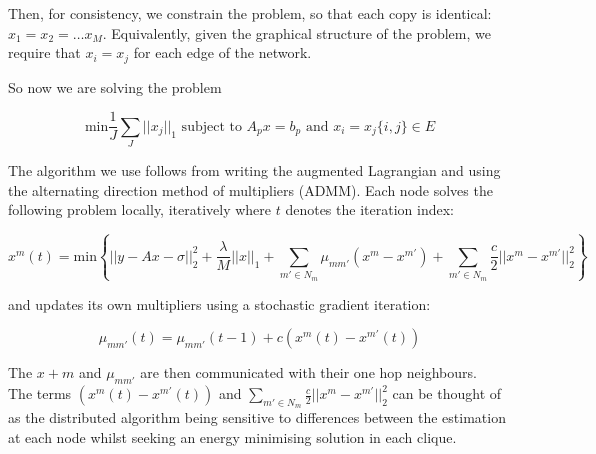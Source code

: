 \documentclass{article}
\begin{document}
Then, for consistency, we constrain the problem, so that each copy is identical: \(x_1 = x_2 = \ldots x_M\). Equivalently, given the graphical structure of the problem, we require that \(x_i = x_j\) for each edge of the network.

So now we are solving the problem

\begin{equation}
\text{min} \frac{1}{J}\sum_J||x_j||_1 \text{ subject to } A_p x = b_p \text{ and } x_i = x_j \{i,j\} \in E 
 \label{constrainedbp}
\end{equation}

The algorithm we use follows from writing the augmented Lagrangian and using the alternating direction method of multipliers (ADMM). Each node solves the following problem locally, iteratively where \(t\) denotes the iteration index: 

\begin{equation}
x^m \left(t\right) = \text{min} \left\lbrace ||y - Ax - \sigma ||_2^2 + \frac{\lambda}{M}||x||_1 + \sum_{m' \in N_m} \mu_{mm'}\left(x^m - x^{m'}\right) +  \sum_{m' \in N_m}\frac{c}{2}|| x^m - x^{m'}||_2^2\right\rbrace
\end{equation}

and updates its own multipliers using a stochastic gradient iteration:

\begin{equation}
\mu_{mm'}\left(t\right) = \mu_{mm'}\left(t-1\right)  + c\left(x^m\left(t\right) - x^{m'}\left(t\right)\right)
\end{equation}

The \(x+m\) and \(\mu_{mm'}\) are then communicated with their one hop neighbours.
\\
The terms \(\left(x^m\left(t\right) - x^{m'}\left(t\right)\right)\) and \(\sum_{m' \in N_m}\frac{c}{2}|| x^m - x^{m'}||_2^2\) can be thought of as the distributed algorithm being sensitive to differences between the estimation at each node whilst seeking an energy minimising solution in each clique.
\end{document}
